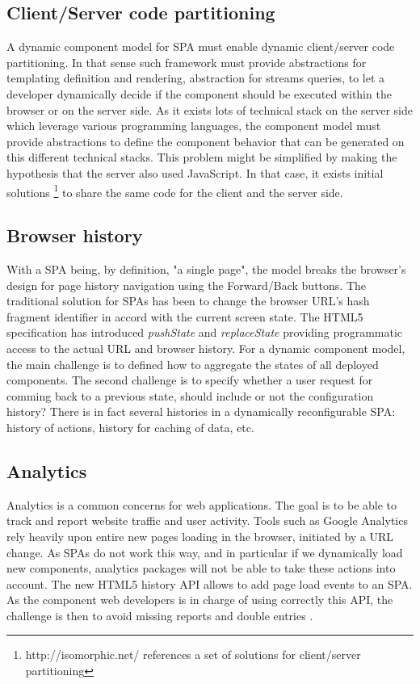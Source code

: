 \subsection{Client/Server code partitioning}
A dynamic component model for SPA must enable dynamic client/server code partitioning. In that sense such framework must provide abstractions for templating definition and rendering, abstraction for streams queries, to let a developer dynamically decide if the component should be executed within the browser or on the server side. As it exists lots of technical stack on the server side which leverage various programming languages, the component model must provide abstractions to define the component behavior that can be generated on this different technical stacks. This problem might be simplified by making the hypothesis that the server also used JavaScript. In that case, it exists initial solutions \footnote{http://isomorphic.net/ references a set of solutions for client/server partitioning} to share the same code for the client and the server side.

\subsection{Browser history}
With a SPA being, by definition, "a single page", the model breaks the browser's design for page history navigation using the Forward/Back buttons. The traditional solution for SPAs has been to change the browser URL's hash fragment identifier in accord with the current screen state.
The HTML5 specification has introduced \textit{pushState} and \textit{replaceState} providing programmatic access to the actual URL and browser history.
For a dynamic component model, the main challenge is to defined how to aggregate the states of all deployed components.
The second challenge is to specify whether a user request for comming back to a previous state, should include or not the configuration history?
There is in fact several histories in a dynamically reconfigurable SPA: history of actions, history for caching of data, etc.



\subsection{Analytics}

Analytics is a common concerns for web applications. The goal is to be able to track and report website traffic and user activity.
Tools such as Google Analytics rely heavily upon entire new pages loading in the browser, initiated by a URL change. As SPAs do not work this way, and in particular if we dynamically load new components, analytics packages will not be able to take these actions into account.
The new HTML5 history API allows to add page load events to an SPA.
As the component web developers is in charge of using correctly this API, the challenge is then to avoid missing reports and double entries   .

